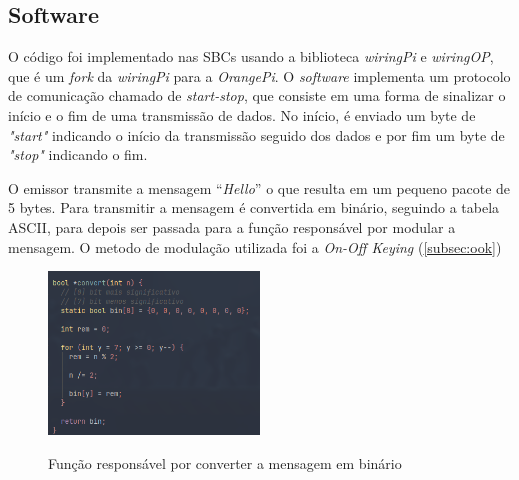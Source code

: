 \newpage

\subsection{Software}

O código foi implementado nas SBCs usando a biblioteca \textit{wiringPi} e \textit{wiringOP}, que é um \textit{fork} da \textit{wiringPi} para a \textit{OrangePi}. O \textit{software} implementa um protocolo de comunicação chamado de \textit{start-stop}, que consiste em uma forma de sinalizar o início e o fim de uma transmissão de dados. No início, é enviado um byte de \textit{"start"} indicando o início da transmissão seguido dos dados e por fim um byte de \textit{"stop"} indicando o fim.

O emissor transmite a mensagem ``\textit{Hello}” o que resulta em um pequeno pacote de 5 bytes. Para transmitir a mensagem é convertida em binário, seguindo a tabela ASCII, para depois ser passada para a função responsável por modular a mensagem. O metodo de modulação utilizada foi a \textit{On-Off Keying} (\autoref{subsec:ook})

\begin{figure}[!htbp]
  \caption{Função responsável por converter a mensagem em binário}
  \includegraphics[width=0.5\textwidth]{images/convert_emissor.png}
  \label{convert_emissor}
\end{figure}



